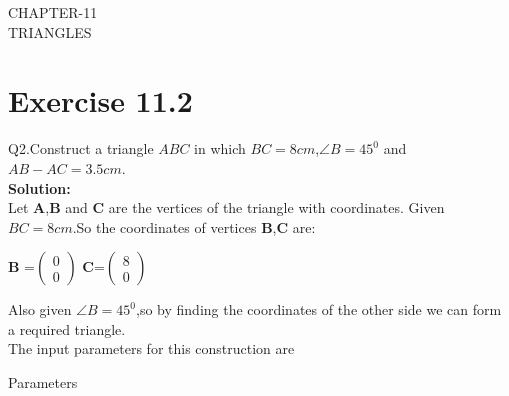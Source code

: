 \documentclass{article}
\let\vec\mathbf
\begin{document}
\begin{center}
        \textbf\large{CHAPTER-11 \\ TRIANGLES}
\end{center}
\section{Exercise 11.2}
Q2.Construct a triangle $ABC$ in which $BC=8cm$,$\angle{B}=45^0$ and $AB-AC=3.5cm$. \\
\textbf{Solution:}\\
Let $\vec{A}$,$\vec{B}$ and $\vec{C}$ are the vertices of the triangle with coordinates.
Given $BC=8cm$.So the coordinates of vertices $\vec{B}$,$\vec{C}$ are:
\begin{center}
{
$\vec{B}$ =$\begin{pmatrix}
0 \\
0 
\end{pmatrix}$ 
\vspace{1mm}
$\vec{C}$=$\begin{pmatrix}
8 \\
0
\end{pmatrix}$
\vspace{1mm}
}
\end{center}
Also given $\angle{B}=45^0$,so by finding the coordinates of the other side we can form a required triangle. \\
 \vspace{2mm}
 The input parameters for this construction are
 \begin{table}[h]
	  \centering
	  
	  \caption{Parameters}
	  \label{tab:Table1}
\end{table}
\end{document}
